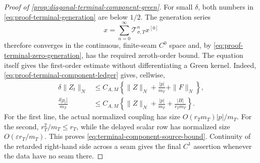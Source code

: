 \begin{proof}[Proof of
\cref{prop:diagonal-terminal-component-green}]
For small \(\delta\), both numbers in
\cref{eq:proof-terminal-generation} are below \(1/2\).  The generation
series
\[
 x=\sum_{n=0}^\infty\mathscr T_{\sigma,T}^nx^{[0]}
\]
therefore converges in the continuous, finite-seam \(C^0\) space and,
by \cref{eq:proof-terminal-zero-generation}, has the required zeroth-order
bound.  The equation itself gives the first-order estimate without
differentiating a Green kernel.  Indeed,
\cref{eq:proof-terminal-component-ledger} gives, cellwise,
\begin{align*}
 \delta\|Z_t\|_N
 &\le C_{A,M}\left\{\|Z\|_N+\frac{|p|}{m_T}
                         +\|F\|_N\right\},\\
 \frac{\delta|p_t|}{m_T}
 &\le C_{A,M}\left\{\|Z\|_N+\frac{|p|}{m_T}
                         +\frac{|H|}{r_Tm_T}\right\}.
\end{align*}
For the first line, the actual normalized coupling has size
\(O(r_Tm_T)|p|/m_T\).  For the second,
\(r_T^2/m_T\le r_T\), while the delayed scalar row has normalized size
\(O(\varepsilon r_T/m_T)\).  This proves
\cref{eq:terminal-component-source-bound}.  Continuity of the retarded
right-hand side across a seam gives the final \(C^1\) assertion whenever
the data have no seam there.


\end{proof}

